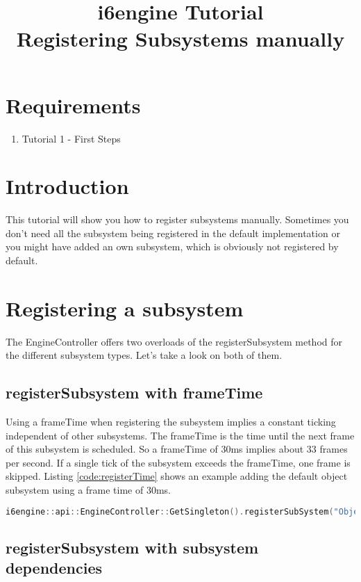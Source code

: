 \documentclass{article}
\title{i6engine Tutorial \\ Registering Subsystems manually}
\begin{document}
\section{Requirements}

\begin{enumerate}
\item Tutorial 1 - First Steps
\end{enumerate}

\section{Introduction}

This tutorial will show you how to register subsystems manually. Sometimes you don't need all the subsystem being registered in the default implementation or you might have added an own subsystem, which is obviously not registered by default.

\section{Registering a subsystem}

The EngineController offers two overloads of the registerSubsystem method for the different subsystem types. Let's take a look on both of them.

\subsection{registerSubsystem with frameTime}

Using a frameTime when registering the subsystem implies a constant ticking independent of other subsystems. The frameTime is the time until the next frame of this subsystem is scheduled. So a frameTime of 30ms implies about 33 frames per second. If a single tick of the subsystem exceeds the frameTime, one frame is skipped. Listing \ref{code:registerTime} shows an example adding the default object subsystem using a frame time of 30ms.

\begin{lstlisting}[language=C++, style=basic, caption={registering object subsystem}, label=code:registerTime]
i6engine::api::EngineController::GetSingleton().registerSubSystem("Object", new i6engine::modules::ObjectController(), 30000);
\end{lstlisting}

\subsection{registerSubsystem with subsystem dependencies}
\end{document}
